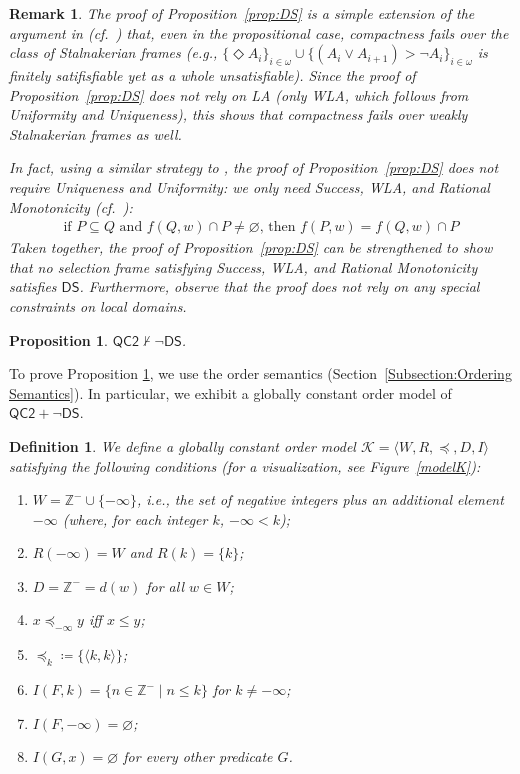 \documentclass[12pt]{article}
\newtheorem{definition}{Definition}
\newtheorem{proposition}{Proposition}
\newtheorem{remark}{Remark}
\newcommand{\tup}[1]{\langle #1 \rangle}
\newcommand{\would}{\mathbin{>}}
\newcommand{\pos}{\mathop{\Diamond}}
\begin{document}
\begin{remark}
    The proof of Proposition~\ref{prop:DS} is a simple extension of the argument in \cite{kocurek2025stalnaker} (cf.\ \cite[\S2.2]{dorr2024logic}) that, even in the propositional case, compactness fails over the class of Stalnakerian frames (e.g., $\{\pos A_i\}_{i \in \omega} \cup \{(A_i \vee A_{i+1}) \would \neg A_i\}_{i \in \omega}$ is finitely satifisfiable yet as a whole unsatisfiable). 
    Since the proof of Proposition~\ref{prop:DS} does not rely on LA (only WLA, which follows from Uniformity and Uniqueness), this shows that compactness fails over weakly Stalnakerian frames as well. 
    
    In fact, using a similar strategy to \cite{kocurek2025stalnaker}, the proof of Proposition~\ref{prop:DS} does not require Uniqueness and Uniformity: we only need Success, WLA, and Rational Monotonicity (cf.\ \cite[pp.~104--5; Prop II.59]{Veltman1985logics}): 
    \begin{align*}
        \text{if } P \subseteq Q \text{ and } f(Q,w) \cap P \neq \varnothing \text{, then } f(P,w) = f(Q,w) \cap P
    \end{align*}
    Taken together, the proof of Proposition~\ref{prop:DS} can be strengthened to show that no selection frame satisfying Success, WLA, and Rational Monotonicity satisfies $\mathsf{DS}$. 
    Furthermore, observe that the proof does not rely on any special constraints on local domains. 
\end{remark}


\begin{proposition}\label{counter-model}
$\mathsf{QC2} \nvdash \neg\mathsf{DS}$.
\end{proposition}

To prove Proposition \ref{counter-model}, we use the order semantics (Section~\ref{Subsection:Ordering Semantics}). In particular, we exhibit a globally constant order model of $\mathsf{QC2} + \neg \mathsf{DS}$. 


\begin{definition}\label{order-model}
    We define a globally constant order model $\mathcal{K}=\tup{W, R, \preceq, D, I}$ satisfying the following conditions (for a visualization, see Figure~\ref{modelK}):
\begin{enumerate}
    \item $W = \mathbb{Z}^- \cup \{-\infty\}$, i.e., the set of negative integers plus an additional element $-\infty$ (where, for each integer $k$, $-\infty <k$);
    \item $R(-\infty) = W$ and $R(k) = \{k\}$;
    \item $D = \mathbb{Z}^- = d(w)$ for all $w \in W$;
    \item $x \preceq_{-\infty} y$ iff $x \leq y$;
    \item $\preceq_{k}\coloneqq\{\tup{k,k}\}$;
    \item $I(F,k) = \{n \in \mathbb{Z}^- \mid n \leq k\}$ for $k \neq -\infty$;
    \item $I(F,-\infty) = \varnothing$;
    \item $I(G,x) = \varnothing$ for every other predicate $G$.
\end{enumerate}
\end{definition}
\end{document}
